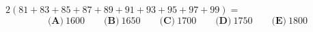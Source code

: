 $2(81+83+85+87+89+91+93+95+97+99)=$
\[\textbf{(A)}\ 1600\qquad\textbf{(B)}\ 1650\qquad\textbf{(C)}\ 1700\qquad\textbf{(D)}\ 1750\qquad\textbf{(E)}\ 1800\]
